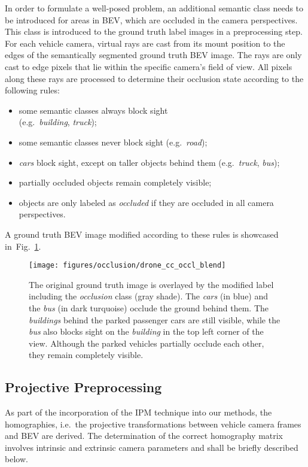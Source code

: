 \documentclass[a4paper, 10pt, conference]{ieeeconf}
\newcommand{\fig}[1]{Fig.~\ref{#1}}
\begin{document}
In order to formulate a well-posed problem, an additional semantic class needs to be introduced for areas in BEV, which are occluded in the camera perspectives. This class is introduced to the ground truth label images in a preprocessing step. For each vehicle camera, virtual rays are cast from its mount position to the edges of the semantically segmented ground truth BEV image. The rays are only cast to edge pixels that lie within the specific camera's field of view. All pixels along these rays are processed to determine their occlusion state according to the following rules:
\begin{itemize}
  \item some semantic classes always block sight \\(e.g.\ \textit{building}, \textit{truck});
  \item some semantic classes never block sight (e.g.\ \textit{road});
  \item \textit{cars} block sight, except on taller objects behind them (e.g.\ \textit{truck}, \textit{bus});
  \item partially occluded objects remain completely visible;
  \item objects are only labeled as \textit{occluded} if they are occluded in all camera perspectives.
\end{itemize}
A ground truth BEV image modified according to these rules is showcased in~\fig{fig:occlusion}.
\begin{figure}[t]
  \centering
  \texttt{[image: figures/occlusion/drone\_cc\_occl\_blend]}
  \caption{The original ground truth image is overlayed by the modified label including the \textit{occlusion} class (gray shade). The \textit{cars} (in blue) and the \textit{bus} (in dark turquoise) occlude the ground behind them. The \textit{buildings} behind the parked passenger cars are still visible, while the \textit{bus} also blocks sight on the \textit{building} in the top left corner of the view. Although the parked vehicles partially occlude each other, they remain completely visible.}
  \label{fig:occlusion}
\end{figure}

\subsection{Projective Preprocessing}\label{sec:ProjectivePreprocessing}

As part of the incorporation of the IPM technique into our methods, the homographies, i.e.\ the projective transformations between vehicle camera frames and BEV are derived. The determination of the correct homography matrix involves intrinsic and extrinsic camera parameters and shall be briefly described below.
\end{document}
